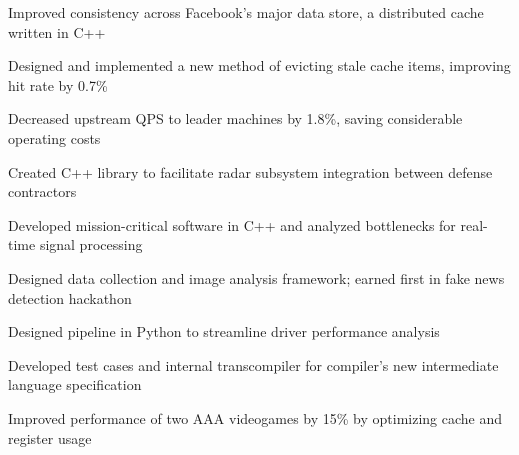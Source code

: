 \documentclass[]{resume-style}
\begin{document}
\vspace{1.5mm}
\begin{tightemize}
\vspace{-1.0mm}
\item Improved consistency across Facebook's major data store, a distributed cache written in C++
\item Designed and implemented a new method of evicting stale cache items, improving hit rate by 0.7\%
\item Decreased upstream QPS to leader machines by 1.8\%, saving considerable operating costs
\end{tightemize}

\vspace{2mm}
\vspace{-1.35mm}
\begin{tightemize}
\vspace{\topsep} %
\item Created C++ library to facilitate radar subsystem integration between defense contractors
\item Developed mission-critical software in C++ and analyzed bottlenecks for real-time signal processing
\item Designed data collection and image analysis framework; earned first in fake news detection hackathon
\end{tightemize}

\vspace{2mm}
\vspace{0.65mm}
\vspace{1.28mm}
\begin{tightemize}
\item Designed pipeline in Python to streamline driver performance analysis
\item Developed test cases and internal transcompiler for compiler's new intermediate language specification
\item Improved performance of two AAA videogames by 15\% by optimizing cache and register usage%
\end{tightemize}
\end{document}
